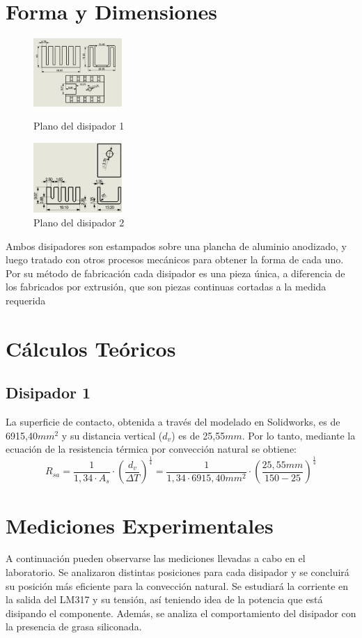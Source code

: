 \documentclass[conference]{IEEEtran}
\begin{document}
\section{Forma y Dimensiones}
\begin{figure}[h]
    \centering
    \includegraphics[width=0.3\textwidth]{PlanoRamiCompleto.png}
    \caption{Plano del disipador 1}
    \centering
    \includegraphics[width=0.3\textwidth]{disipadorFacu.png}
    \caption{Plano del disipador 2}
\end{figure}
Ambos disipadores son estampados sobre una plancha de aluminio anodizado, y luego tratado con otros 
procesos mecánicos para obtener la forma de cada uno. Por su método de fabricación cada disipador
es una pieza única, a diferencia de los fabricados por extrusión, que son piezas continuas cortadas 
a la medida requerida

\section{Cálculos Teóricos}
\subsection{Disipador 1}

La superficie de contacto, obtenida a través del modelado en Solidworks, es de 6915,40$mm^2$ y
su distancia vertical ($d_v$) es de 25,55$mm$.
Por lo tanto, mediante la ecuación de la resistencia térmica por convección natural se obtiene:
\begin{equation}
    R_{sa} = \frac{1}{1,34\cdot A_s}\cdot (\frac{d_v}{\Delta T})^{\frac{1}{4}} = \frac{1}{1,34\cdot 6915,40mm^2}\cdot (\frac{25,55mm}{150-25})^{\frac{1}{4}}
\end{equation}

\section{Mediciones Experimentales}
A continuación pueden observarse las mediciones llevadas a cabo en el laboratorio. Se analizaron
distintas posiciones para cada disipador y se concluirá su posición más eficiente para la convección
natural. Se estudiará la corriente en la salida del LM317 y su tensión, así teniendo idea de la potencia
que está disipando el componente. Además, se analiza el comportamiento del disipador con la presencia 
de grasa siliconada.
\end{document}
